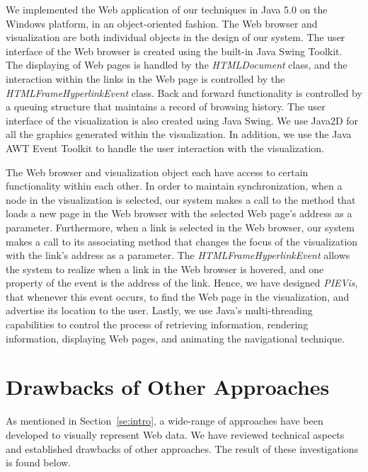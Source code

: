 \documentclass[]{article}
\begin{document}
{We implemented the Web application of our techniques in Java 5.0 on the Windows platform, in an object-oriented fashion.
The Web browser and visualization are both individual objects in the design of our system.
The user interface of the Web browser is created using the built-in Java Swing Toolkit.
The displaying of Web pages is handled by the {\em HTMLDocument} class, and the interaction within the links in the Web page is controlled by the {\em HTMLFrameHyperlinkEvent} class.
Back and forward functionality is controlled by a queuing structure that maintains a record of browsing history.
The user interface of the visualization is also created using Java Swing.
We use Java2D for all the graphics generated within the visualization.
In addition, we use the Java AWT Event Toolkit to handle the user interaction with the visualization.

The Web browser and visualization object each have access to certain functionality within each other.
In order to maintain synchronization, when a node in the visualization is selected, our system makes a call to the method that loads a new page in the Web browser with the selected Web page's address as a parameter.
Furthermore, when a link is selected in the Web browser, our system makes a call to its associating method that changes the focus of the visualization with the link's address as a parameter.
The {\em HTMLFrameHyperlinkEvent} allows the system to realize when a link in the Web browser is hovered, and one property of the event is the address of the link.  Hence, we have designed {\em PIEVis}, that whenever this event occurs, to find the Web page in the visualization, and advertise its location to the user.
Lastly, we use Java's multi-threading capabilities to control the process of retrieving information, rendering information, displaying Web pages, and animating the navigational technique.

\section{Drawbacks of Other Approaches}
\label{se:other}

As mentioned in Section~\ref{se:intro}, a wide-range of approaches have been developed to visually represent Web data.  We have reviewed technical aspects and established drawbacks of other approaches.
The result of these investigations is found below.

}
\end{document}
